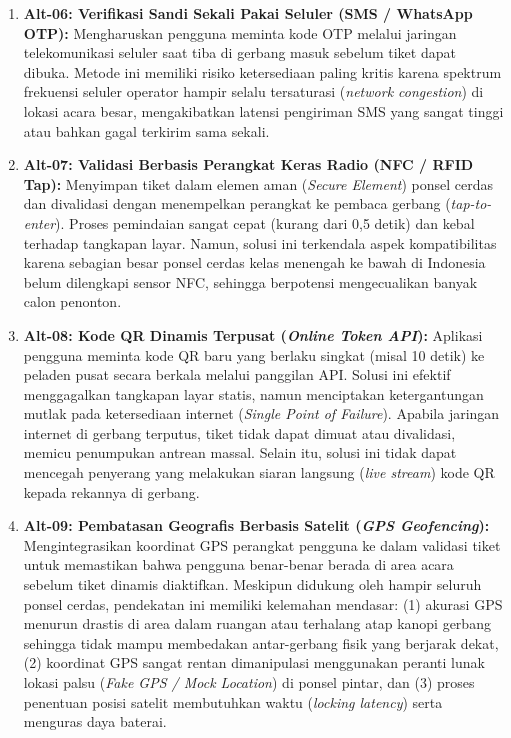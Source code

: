 \begin{enumerate}
    \item \textbf{Alt-06: Verifikasi Sandi Sekali Pakai Seluler (SMS / WhatsApp OTP):} Mengharuskan pengguna meminta kode OTP melalui jaringan telekomunikasi seluler saat tiba di gerbang masuk sebelum tiket dapat dibuka. Metode ini memiliki risiko ketersediaan paling kritis karena spektrum frekuensi seluler operator hampir selalu tersaturasi (\textit{network congestion}) di lokasi acara besar, mengakibatkan latensi pengiriman SMS yang sangat tinggi atau bahkan gagal terkirim sama sekali.
    
    \item \textbf{Alt-07: Validasi Berbasis Perangkat Keras Radio (NFC / RFID Tap):} Menyimpan tiket dalam elemen aman (\textit{Secure Element}) ponsel cerdas dan divalidasi dengan menempelkan perangkat ke pembaca gerbang (\textit{tap-to-enter}). Proses pemindaian sangat cepat (kurang dari 0,5 detik) dan kebal terhadap tangkapan layar. Namun, solusi ini terkendala aspek kompatibilitas karena sebagian besar ponsel cerdas kelas menengah ke bawah di Indonesia belum dilengkapi sensor NFC, sehingga berpotensi mengecualikan banyak calon penonton.
    
    \item \textbf{Alt-08: Kode QR Dinamis Terpusat (\textit{Online Token API}):} Aplikasi pengguna meminta kode QR baru yang berlaku singkat (misal 10 detik) ke peladen pusat secara berkala melalui panggilan API. Solusi ini efektif menggagalkan tangkapan layar statis, namun menciptakan ketergantungan mutlak pada ketersediaan internet (\textit{Single Point of Failure}). Apabila jaringan internet di gerbang terputus, tiket tidak dapat dimuat atau divalidasi, memicu penumpukan antrean massal. Selain itu, solusi ini tidak dapat mencegah penyerang yang melakukan siaran langsung (\textit{live stream}) kode QR kepada rekannya di gerbang.
    
    \item \textbf{Alt-09: Pembatasan Geografis Berbasis Satelit (\textit{GPS Geofencing}):} Mengintegrasikan koordinat GPS perangkat pengguna ke dalam validasi tiket untuk memastikan bahwa pengguna benar-benar berada di area acara sebelum tiket dinamis diaktifkan. Meskipun didukung oleh hampir seluruh ponsel cerdas, pendekatan ini memiliki kelemahan mendasar: (1) akurasi GPS menurun drastis di area dalam ruangan atau terhalang atap kanopi gerbang sehingga tidak mampu membedakan antar-gerbang fisik yang berjarak dekat, (2) koordinat GPS sangat rentan dimanipulasi menggunakan peranti lunak lokasi palsu (\textit{Fake GPS / Mock Location}) di ponsel pintar, dan (3) proses penentuan posisi satelit membutuhkan waktu (\textit{locking latency}) serta menguras daya baterai.
    

\end{enumerate}
